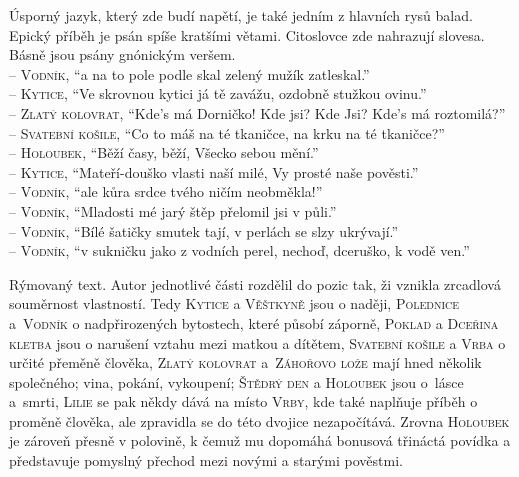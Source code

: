 \documentclass[FGBook.tex]{subfiles}
\begin{document}
\noindent
Úsporný jazyk, který zde budí napětí, je také jedním z hlavních rysů balad. Epický příběh je psán spíše kratšími větami. Citoslovce zde nahrazují slovesa. Básně jsou psány gnónickým veršem. \\
{\small
{} -- \textsc{Vodník}, \enquote{a na to pole podle skal zelený mužík zatleskal.} \\
 -- \textsc{Kytice}, \enquote{Ve skrovnou kytici já tě zavážu, ozdobně stužkou ovinu.} \\
 -- \textsc{Zlatý kolovrat}, \enquote{Kde's má Dorničko! Kde jsi? Kde Jsi?
Kde's má roztomilá?}\\
 -- \textsc{Svatební košile}, \enquote{Co to máš na té tkaničce,
na krku na té tkaničce?}\\
 -- \textsc{Holoubek}, \enquote{Běží časy, běží,
Všecko sebou mění.}\\
 -- \textsc{Kytice}, \enquote{Mateří-douško vlasti naší milé,
Vy prosté naše pověsti.}\\
 -- \textsc{Vodník}, \enquote{ale kůra srdce tvého
ničím neobměkla!}\\
 -- \textsc{Vodník}, \enquote{Mladosti mé jarý štěp
přelomil jsi v půli.}\\
 -- \textsc{Vodník}, \enquote{Bílé šatičky smutek tají,
v perlách se slzy ukrývají.}\\
 -- \textsc{Vodník}, \enquote{v sukničku jako z vodních perel,
nechoď, dceruško, k vodě ven.}\\
}

\vspace{-1em}
\noindent 
Rýmovaný text. Autor jednotlivé části rozdělil do pozic tak, ži vznikla zrcadlová souměrnost vlastností. Tedy \textsc{Kytice} a \textsc{Věštkyně} jsou o naději, \textsc{Polednice} a~\textsc{Vodník} o nadpřirozených bytostech, které působí záporně, \textsc{Poklad} a \textsc{Dceřina kletba} jsou o narušení vztahu mezi matkou a dítětem, \textsc{Svatební košile} a \textsc{Vrba} o určité přeměně člověka, \textsc{Zlatý kolovrat} a~\textsc{Záhořovo lože} mají hned několik společného; vina, pokání, vykoupení; \textsc{Štědrý den} a \textsc{Holoubek} jsou o~lásce a~smrti, \textsc{Lilie} se pak někdy dává na místo \textsc{Vrby}, kde také naplňuje příběh o proměně člověka, ale zpravidla se do této dvojice nezapočítává. Zrovna \textsc{Holoubek} je zároveň přesně v polovině, k čemuž mu dopomáhá bonusová třináctá povídka a představuje pomyslný přechod mezi novými a starými pověstmi.
\end{document}
